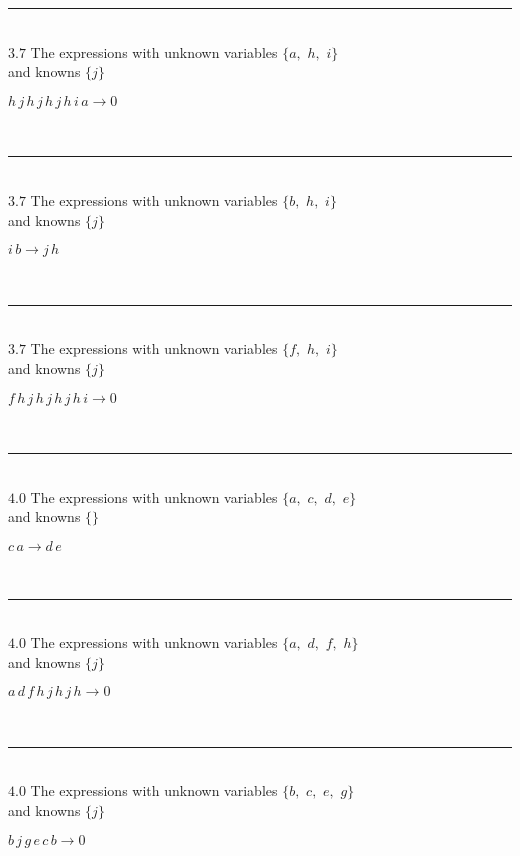\documentclass[rep10,leqno]{report}
\begin{document}
\rule[3pt]{6in}{.7pt}\\
$3.7$  The expressions with unknown variables $\{a,
$ $
h,
$ $
i\}$\\
and knowns $\{j\}$\smallskip\\
\begin{minipage}{6in}
$
h\,
 j\,
 h\,
 j\,
 h\,
 j\,
 h\,
 i\,
 a\rightarrow 0
$
\end{minipage}\\
\rule[3pt]{6in}{.7pt}\\
$3.7$  The expressions with unknown variables $\{b,
$ $
h,
$ $
i\}$\\
and knowns $\{j\}$\smallskip\\
\begin{minipage}{6in}
$
i\,
 b\rightarrow j\,
 h
$
\end{minipage}\\
\rule[3pt]{6in}{.7pt}\\
$3.7$  The expressions with unknown variables $\{f,
$ $
h,
$ $
i\}$\\
and knowns $\{j\}$\smallskip\\
\begin{minipage}{6in}
$
f\,
 h\,
 j\,
 h\,
 j\,
 h\,
 j\,
 h\,
 i\rightarrow 0
$
\end{minipage}\\
\rule[3pt]{6in}{.7pt}\\
$4.0$  The expressions with unknown variables $\{a,
$ $
c,
$ $
d,
$ $
e\}$\\
and knowns $\{\}$\smallskip\\
\begin{minipage}{6in}
$
c\,
 a\rightarrow d\,
 e
$
\end{minipage}\\
\rule[3pt]{6in}{.7pt}\\
$4.0$  The expressions with unknown variables $\{a,
$ $
d,
$ $
f,
$ $
h\}$\\
and knowns $\{j\}$\smallskip\\
\begin{minipage}{6in}
$
a\,
 d\,
 f\,
 h\,
 j\,
 h\,
 j\,
 h\rightarrow 0
$
\end{minipage}\\
\rule[3pt]{6in}{.7pt}\\
$4.0$  The expressions with unknown variables $\{b,
$ $
c,
$ $
e,
$ $
g\}$\\
and knowns $\{j\}$\smallskip\\
\begin{minipage}{6in}
$
b\,
 j\,
 g\,
 e\,
 c\,
 b\rightarrow 0
$
\end{minipage}\medskip \\
\end{document}
